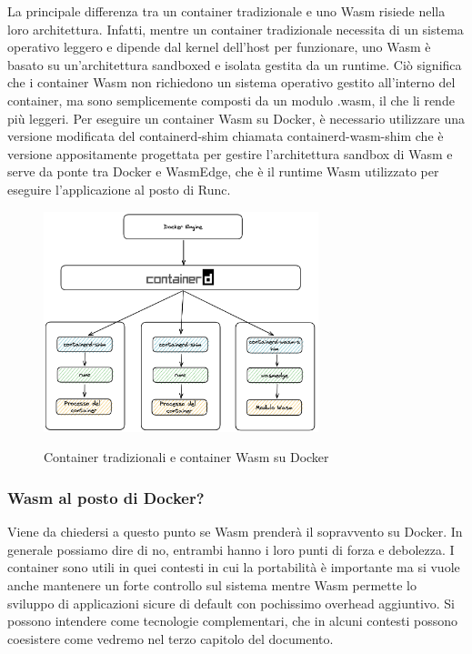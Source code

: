 La principale differenza tra un container tradizionale e uno Wasm risiede nella loro architettura. Infatti, mentre un
container tradizionale necessita di un sistema operativo leggero e dipende dal kernel dell'host per funzionare, uno Wasm
è basato su un'architettura sandboxed e isolata gestita da un runtime. Ciò significa che i container Wasm non richiedono
un sistema operativo gestito all'interno del container, ma sono semplicemente composti da un modulo .wasm, il che li
rende più leggeri. Per eseguire un container Wasm su Docker, è necessario utilizzare una versione modificata del
containerd-shim chiamata containerd-wasm-shim che è versione appositamente progettata per gestire l'architettura sandbox
di Wasm e serve da ponte tra Docker e WasmEdge, che è il runtime Wasm utilizzato per eseguire l'applicazione al posto di
Runc.
\begin{figure}[h]
    \centering
    \captionsetup{justification=centering}
    \includegraphics[width=8cm]{./chapters/2.wasi-in-depth/images/10.docker_and_wasm.png}
    \label{docker_and_wasm_wasmedge}
    \caption{Container tradizionali e container Wasm su Docker}
\end{figure}

\subsubsection{Wasm al posto di Docker?}
Viene da chiedersi a questo punto se Wasm prenderà il sopravvento su Docker\cite{why-containers-and-wasm}. In generale
possiamo dire di no, entrambi hanno i loro punti di forza e debolezza. I container sono utili in quei contesti in cui la
portabilità è importante ma si vuole anche mantenere un forte controllo sul sistema mentre Wasm permette lo sviluppo di
applicazioni sicure di default con pochissimo overhead aggiuntivo. Si possono intendere come tecnologie complementari,
che in alcuni contesti possono coesistere come vedremo nel terzo capitolo del documento.

